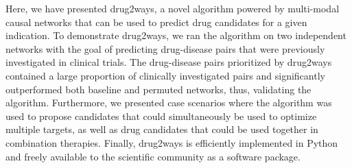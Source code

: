 Here, we have presented drug2ways, a novel algorithm powered by multi-modal causal networks that can be used to predict drug candidates for a given indication. To demonstrate drug2ways, we ran the algorithm on two independent networks with the goal of predicting drug-disease pairs that were previously investigated in clinical trials. The drug-disease pairs prioritized by drug2ways contained a large proportion of clinically investigated pairs and significantly outperformed both baseline and permuted networks, thus, validating the algorithm. Furthermore, we presented case scenarios where the algorithm was used to propose candidates that could simultaneously be used to optimize multiple targets, as well as drug candidates that could be used together in combination therapies. Finally, drug2ways is efficiently implemented in Python and freely available to the scientific community as a software package.
